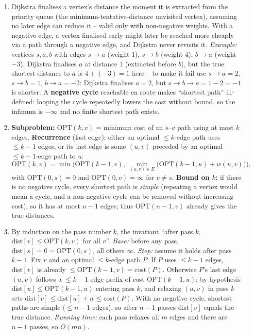 \documentclass[11pt]{article}
\begin{document}
\begin{enumerate}[label=\textbf{A\arabic*.}, leftmargin=2.2em]
\item Dijkstra finalises a vertex's distance the moment it is extracted from the priority
queue (the minimum-tentative-distance unvisited vertex), assuming no later edge can reduce
it -- valid only with non-negative weights. With a negative edge, a vertex finalised early
might later be reached more cheaply via a path through a negative edge, and Dijkstra never
revisits it. \emph{Example:} vertices $s, a, b$ with edges $s \to a$ (weight $1$),
$s \to b$ (weight $4$), $b \to a$ (weight $-3$). Dijkstra finalises $a$ at distance $1$
(extracted before $b$), but the true shortest distance to $a$ is $4 + (-3) = 1$ here -- to
make it fail use $s\to a = 2$, $s\to b = 1$, $b \to a = -2$: Dijkstra finalises $a=2$, but
$s\to b\to a = 1 - 2 = -1$ is shorter. A \textbf{negative cycle} reachable en route makes
``shortest path'' ill-defined: looping the cycle repeatedly lowers the cost without bound,
so the infimum is $-\infty$ and no finite shortest path exists.

\item \textbf{Subproblem:} $\mathrm{OPT}(k,v)$ = minimum cost of an $s$--$v$ path using at
most $k$ edges. \textbf{Recurrence} (last edge): either an optimal $\le k$-edge path uses
$\le k-1$ edges, or its last edge is some $(u,v)$ preceded by an optimal $\le k-1$-edge path
to $u$:
\[
\mathrm{OPT}(k,v) = \min\Big( \mathrm{OPT}(k-1, v),\ \min_{(u,v)\in E}\big(\mathrm{OPT}(k-1,u)
+ w(u,v)\big)\Big),
\]
with $\mathrm{OPT}(0,s)=0$ and $\mathrm{OPT}(0,v) = \infty$ for $v \ne s$. \textbf{Bound on
$k$:} if there is no negative cycle, every shortest path is \emph{simple} (repeating a vertex
would mean a cycle, and a non-negative cycle can be removed without increasing cost), so it
has at most $n-1$ edges; thus $\mathrm{OPT}(n-1, v)$ already gives the true distances.

\item By induction on the pass number $k$, the invariant ``after pass $k$,
$\mathrm{dist}[v] \le \mathrm{OPT}(k,v)$ for all $v$''. \emph{Base:} before any pass,
$\mathrm{dist}[s]=0=\mathrm{OPT}(0,s)$, all others $\infty$. \emph{Step:} assume it holds
after pass $k-1$. Fix $v$ and an optimal $\le k$-edge path $P$. If $P$ uses $\le k-1$ edges,
$\mathrm{dist}[v]$ is already $\le \mathrm{OPT}(k-1,v) = \mathrm{cost}(P)$. Otherwise $P$'s
last edge $(u,v)$ follows a $\le k-1$-edge prefix of cost $\mathrm{OPT}(k-1,u)$; by
hypothesis $\mathrm{dist}[u] \le \mathrm{OPT}(k-1,u)$ entering pass $k$, and relaxing
$(u,v)$ in pass $k$ sets $\mathrm{dist}[v] \le \mathrm{dist}[u] + w \le \mathrm{cost}(P)$.
With no negative cycle, shortest paths are simple ($\le n-1$ edges), so after $n-1$ passes
$\mathrm{dist}[v]$ equals the true distance. \emph{Running time:} each pass relaxes all $m$
edges and there are $n-1$ passes, so $O(mn)$.


\end{enumerate}
\end{document}
